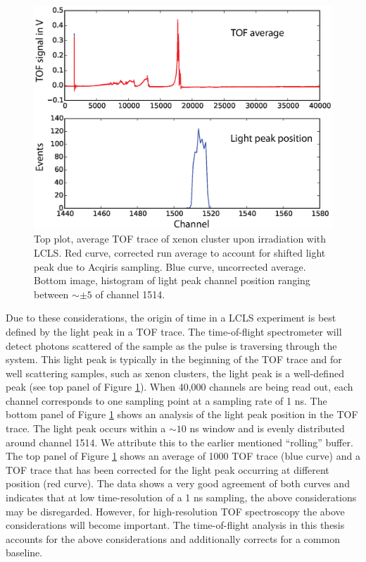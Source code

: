 \begin{figure}
	\centering
		\includegraphics[width=1.00\textwidth]{images/TOF-trace-light-peak.eps}
	\caption[Using light peak to find absolute time zero in Acqiris traces.]{Top plot, average TOF trace of xenon cluster upon irradiation with LCLS. Red curve, corrected run average to account for shifted light peak due to Acqiris sampling. Blue curve, uncorrected average. Bottom image, histogram of light peak channel position ranging between $\sim\pm 5$ of channel 1514.}
	\label{fig:TOF-trace-light-peak}
\end{figure}
Due to these considerations, the origin of time in a LCLS experiment is best defined by the light peak in a TOF trace. The time-of-flight spectrometer will detect photons scattered of the sample as the pulse is traversing through the system. This light peak is typically in the beginning of the TOF trace and for well scattering samples, such as xenon clusters, the light peak is a well-defined peak (see top panel of Figure \ref{fig:TOF-trace-light-peak}). When 40,000 channels are being read out, each channel corresponds to one sampling point at a sampling rate of 1 ns. The bottom panel of Figure \ref{fig:TOF-trace-light-peak} shows an analysis of the light peak position in the TOF trace. The light peak occurs within a $\sim 10$ ns window and is evenly distributed around channel 1514. We attribute this to the earlier mentioned ``rolling'' buffer. The top panel of Figure \ref{fig:TOF-trace-light-peak} shows an average of 1000 TOF trace (blue curve) and a TOF trace that has been corrected for the light peak occurring at different position (red curve). The data shows a very good agreement of both curves and indicates that at low time-resolution of a 1 ns sampling, the above considerations may be disregarded. However, for high-resolution TOF spectroscopy the above considerations will become important. The time-of-flight analysis in this thesis accounts for the above considerations and additionally corrects for a common baseline.
%
%
%
